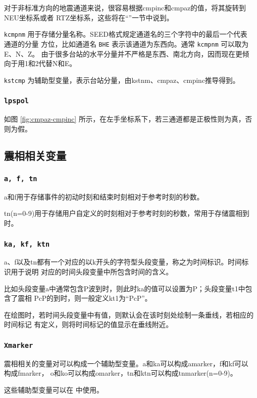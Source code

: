 对于非标准方向的地震通道来说，很容易根据cmpinc和cmpaz的值，将其旋转到NEU坐标系或者
RTZ坐标系，这些将在``''一节中说到。

\texttt{kcmpnm} 用于存储分量名称。SEED格式规定通道名的三个字符中的最后一个代表通道的分量
方位，比如通道名 \texttt{BHE} 表示该通道为东西向。通常 \texttt{kcmpnm} 可以取为E、N、Z。
由于很多台站的水平分量并不严格是东西、南北方向，因而现在更倾向于用1和2代替N和E。

\texttt{kstcmp} 为辅助型变量，表示台站分量，由kstnm、cmpaz、cmpinc推导得到。

\subsubsection{\texttt{lpspol}}
如图 \ref{fig:cmpaz-cmpinc} 所示，在左手坐标系下，若三通道都是正极性则为真，否则为假。

\subsection{震相相关变量}
\subsubsection{\texttt{a, f, tn}}
a和f用于存储事件的初动时刻和结束时刻相对于参考时刻的秒数。

tn(n=0-9)用于存储用户自定义的时刻相对于参考时刻的秒数，常用于存储震相到时。

\subsubsection{\texttt{ka, kf, ktn}}
a、f以及tn都有一个对应的以k开头的字符型头段变量，称之为时间标识。时间标识用于说明
对应的时间头段变量中所包含时间的含义。

比如头段变量a中通常包含P波到时，则此时ka的值可以设置为P；头段变量t1中包含了震相
PcP的到时，则一般定义kt1为``PcP''。

在绘图时，若时间头段变量中有值，则默认会在该时刻处绘制一条垂线，若相应的时间标记
有定义，则将时间标记的值显示在垂线附近。

\subsubsection{\texttt{Xmarker}}
震相相关的变量对可以构成一个辅助型变量。a和ka可以构成amarker，f和kf可以构成fmarker，
o和ko可以构成omarker，tn和ktn可以构成tnmarker(n=0-9)。

这些辅助型变量可以在  中使用。


